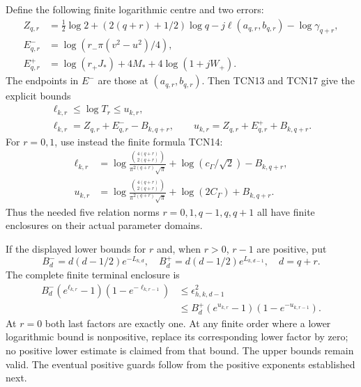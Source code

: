 \documentclass[11pt,a4paper]{article}
\begin{document}
Define the following finite logarithmic centre and two errors:
\begin{equation}\tag{TCN19}
 \begin{aligned}
 Z_{q,r}&=\tfrac12\log2+(2(q+r)+1/2)\log q
          -j\ell(a_{q,r},b_{q,r})-\log\gamma_{q+r},\\
 E_{q,r}^-&=\log(r_-\pi(v^2-u^2)/4),\\
 E_{q,r}^+&=\log(r_+J_*)+4M_*+4\log(1+jW_+).
 \end{aligned}
\end{equation}
The endpoints in $E^-$ are those at $(a_{q,r},b_{q,r})$.
Then TCN13 and TCN17 give the explicit bounds
\begin{equation}\tag{TCN20}\label{tcn:Tbounds}
 \boxed{\begin{gathered}
 \ell_{k,r}\le\log T_r\le u_{k,r},\\
 \ell_{k,r}=Z_{q,r}+E_{q,r}^- -B_{k,q+r},\qquad
 u_{k,r}=Z_{q,r}+E_{q,r}^+ +B_{k,q+r}.
 \end{gathered}}
\end{equation}
For $r=0,1$, use instead the finite formula TCN14:
\begin{equation}\tag{TCN21}
 \begin{aligned}
 \ell_{k,r}&=\log\frac{\binom{4(q+r)}{2(q+r)}}
                              {\pi^{2(q+r)}\sqrt\pi}
                 +\log(c_\Gamma/\sqrt2)-B_{k,q+r},\\
 u_{k,r}&=\log\frac{\binom{4(q+r)}{2(q+r)}}
                              {\pi^{2(q+r)}\sqrt\pi}
                 +\log(2C_\Gamma)+B_{k,q+r}.
 \end{aligned}
\end{equation}
Thus the needed five relation norms $r=0,1,q-1,q,q+1$ all have
finite enclosures on their actual parameter domains.

If the displayed lower bounds for $r$ and, when $r>0$, $r-1$
are positive, put
\[
 B_d^- =d(d-1/2)e^{-L_{k,d}},\quad
 B_d^+=d(d-1/2)e^{L_{k,d-1}},\quad d=q+r.
\]
The complete finite terminal enclosure is
\begin{equation}\tag{TCN22}\label{tcn:finite}
 \boxed{\begin{aligned}
 B_d^-(e^{\ell_{k,r}}-1)
       (1-e^{-\ell_{k,r-1}})
 &\le\epsilon_{h,k,d-1}^2\\
 &\le B_d^+(e^{u_{k,r}}-1)(1-e^{-u_{k,r-1}}).
 \end{aligned}}
\end{equation}
At $r=0$ both last factors are exactly one. At any finite order where
a lower logarithmic bound is nonpositive, replace its corresponding
lower factor by zero; no positive lower estimate is claimed from
that bound. The upper bounds remain valid. The eventual positive
guards follow from the positive exponents established next.
\end{document}
